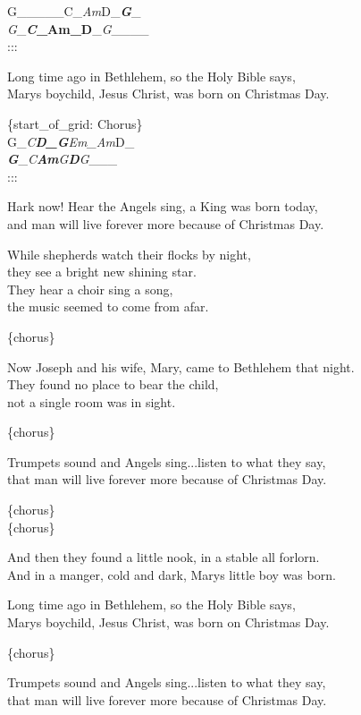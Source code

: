\documentclass[
  letterpaper,
]{scrbook}
\begin{document}
G\_\_\_\_\_\textbar C\_\emph{Am}\textbar D\_\textbf{\emph{\textbar G}}\_\emph{\textbar{}\\
G}\_\textbf{\emph{\textbar C}\_Am\_\textbar D}\_\emph{\textbar G}\_\_\_\_\textbar{}\\
:::

Long time ago in Bethlehem, so the Holy Bible says,\\
Mary\textquotesingle s boychild, Jesus Christ, was born on Christmas
Day.

\{start\_of\_grid: Chorus\}\\
G\_\emph{C\textbf{\textbar D\_\emph{G}}\textbar Em\_Am}\textbar D\_\textbf{\emph{\textbar{}\\
G}}\_\emph{\textbar C\textbf{Am}\textbar G\textbf{D}\textbar G}\_\_\_\textbar{}\\
:::

Hark now! Hear the Angels sing, a King was born today,\\
and man will live forever more because of Christmas Day.

While shepherds watch their flocks by night,\\
they see a bright new shining star.\\
They hear a choir sing a song,\\
the music seemed to come from afar.

\{chorus\}

Now Joseph and his wife, Mary, came to Bethlehem that night.\\
They found no place to bear the child,\\
not a single room was in sight.

\{chorus\}

Trumpets sound and Angels sing...listen to what they say,\\
that man will live forever more because of Christmas Day.

\{chorus\}\\
\{chorus\}

And then they found a little nook, in a stable all forlorn.\\
And in a manger, cold and dark, Mary\textquotesingle s little boy was
born.

Long time ago in Bethlehem, so the Holy Bible says,\\
Mary\textquotesingle s boychild, Jesus Christ, was born on Christmas
Day.

\{chorus\}

Trumpets sound and Angels sing...listen to what they say,\\
that man will live forever more because of Christmas Day.
\end{document}
